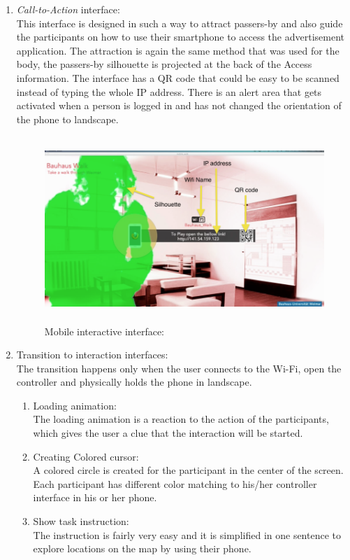 \begin{enumerate}

\item \emph{Call-to-Action} interface: \\
This interface is designed in such a way to attract passers-by and also guide the participants on how to use their smartphone to access the advertisement application. The attraction is again the same method that was used for the body, the passers-by silhouette is projected at the back of the Access information. The interface has a QR code that could be easy to be scanned instead of typing the whole IP address. There is an alert area that gets activated when a person is logged in and has not changed the orientation of the phone to landscape.

\begin{figure}[H]
    \centering
    \includegraphics[width=120mm,height=70mm]{Figures/6/mobile/call-to-action}
    \caption{Mobile interactive interface:}%
    \label{fig:mobile_firstinterface}%
\end{figure}



\item Transition to interaction interfaces: \\
The transition happens only when the user connects to the Wi-Fi, open the controller and physically holds the phone in landscape.

\begin{enumerate}
\item Loading animation:\\
The loading animation is a reaction to the action of the participants, which gives the user a clue that the interaction will be started. 
\item  Creating Colored cursor: \\
A colored circle is created for the participant in the center of the screen. Each participant has different color matching to his/her controller interface in his or her phone.
\item Show task instruction:  \\
The instruction is fairly very easy and it is simplified in one sentence to explore locations on the map by using their phone.



\end{enumerate}
\end{enumerate}
